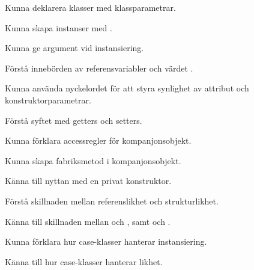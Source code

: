 

\item Kunna deklarera klasser med klassparametrar.
\item Kunna skapa instanser med .
\item Kunna ge argument vid instansiering.
\item Förstå innebörden av referensvariabler och värdet .

\item Kunna använda nyckelordet  för att styra synlighet av attribut och konstruktorparametrar.

\item Förstå syftet med getters och setters.
\item Kunna förklara accessregler för kompanjonsobjekt.
\item Kunna skapa fabriksmetod i kompanjonsobjekt.
\item Känna till nyttan med en privat konstruktor.

\item Förstå skillnaden mellan referenslikhet och strukturlikhet.
\item Känna till skillnaden mellan \code{==} och , samt \code{!=} och .

\item Kunna förklara hur case-klasser hanterar instansiering.
\item Känna till hur case-klasser hanterar likhet.

